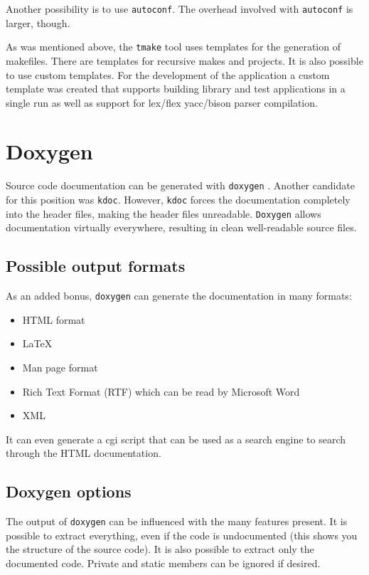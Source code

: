 Another possibility is to use \verb=autoconf=. The overhead involved with
\verb=autoconf= is larger, though.

As was mentioned above, the \verb=tmake= tool uses templates for the generation
of makefiles. There are templates for recursive makes and projects. It is also
possible to use custom templates. For the development of the application a
custom template was created that supports building library and test
applications in a single run as well as support for lex/flex yacc/bison parser
compilation.

\section{Doxygen} \label{chap:env:doxygen}
Source code documentation can be generated with \verb=doxygen= \cite{doxygen}.
Another candidate for this position was \verb=kdoc=. However, \verb=kdoc=
forces the documentation completely into the header files, making the header
files unreadable. \verb=Doxygen= allows documentation virtually everywhere,
resulting in clean well-readable source files.

\subsection{Possible output formats}
As an added bonus, \verb=doxygen= can generate the documentation in many
formats:
\begin{itemize}
\item HTML format
\item \LaTeX
\item Man page format
\item Rich Text Format (RTF) which can be read by Microsoft Word
\item XML
\end{itemize}
It can even generate a cgi script that can be used as a search engine to search
through the HTML documentation.

\subsection{Doxygen options}
The output of \verb=doxygen=  can be influenced with the many features present.
It is possible to extract everything, even if the code is undocumented (this
shows you the structure of the source code). It is also possible to extract
only the documented code. Private and static members can be ignored if desired.

